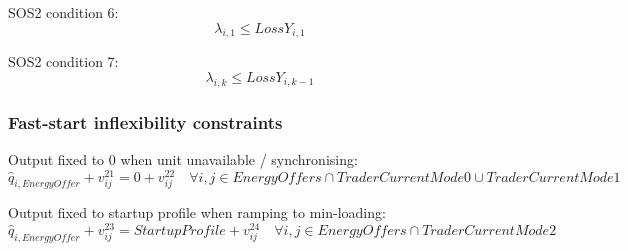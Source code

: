 \documentclass{article}
\begin{document}
SOS2 condition 6:
\begin{equation}
	\lambda_{i,1} \leq LossY_{i,1}
\end{equation}

SOS2 condition 7:
\begin{equation}
\lambda_{i,k} \leq LossY_{i,k-1}
\end{equation}

\subsubsection{Fast-start inflexibility constraints}
%
%
%
%
%
%

Output fixed to 0 when unit unavailable / synchronising:
\begin{equation}
	\hat{q}_{i,EnergyOffer} + v_{ij}^{21} = 0 + v_{ij}^{22} \quad \forall i,j \in EnergyOffers \cap TraderCurrentMode0 \cup TraderCurrentMode1
\end{equation}

Output fixed to startup profile when ramping to min-loading:
\begin{equation}
\hat{q}_{i,EnergyOffer} + v_{ij}^{23} = StartupProfile + v_{ij}^{24} \quad \forall i,j \in EnergyOffers \cap TraderCurrentMode2
\end{equation}
\end{document}
